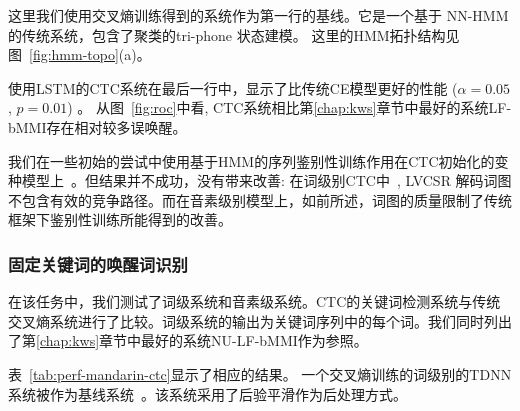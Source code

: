 这里我们使用交叉熵训练得到的系统作为第一行的基线。它是一个基于 NN-HMM 的传统系统，包含了聚类的tri-phone 状态建模。 这里的HMM拓扑结构见图~\ref{fig:hmm-topo}(a)。

使用LSTM的CTC系统在最后一行中，显示了比传统CE模型更好的性能 ($\alpha = 0.05$, $p = 0.01$) 。 从图~\ref{fig:roc}中看, CTC系统相比第\ref{chap:kws}章节中最好的系统LF-bMMI存在相对较多误唤醒。

我们在一些初始的尝试中使用基于HMM的序列鉴别性训练作用在CTC初始化的变种模型上~\cite{sak2015fast,nict-icassp17}。但结果并不成功，没有带来改善: 在词级别CTC中~\cite{li2018developing}, LVCSR 解码词图不包含有效的竞争路径。而在音素级别模型上，如前所述，词图的质量限制了传统框架下鉴别性训练所能得到的改善。%



\subsubsection{固定关键词的唤醒词识别}

在该任务中，我们测试了词级系统和音素级系统。CTC的关键词检测系统与传统交叉熵系统进行了比较。词级系统的输出为关键词序列中的每个词。我们同时列出了第\ref{chap:kws}章节中最好的系统NU-LF-bMMI作为参照。

表~\ref{tab:perf-mandarin-ctc}显示了相应的结果。
一个交叉熵训练的词级别的TDNN系统被作为基线系统~\cite{chen2014small}。该系统采用了后验平滑作为后处理方式。


